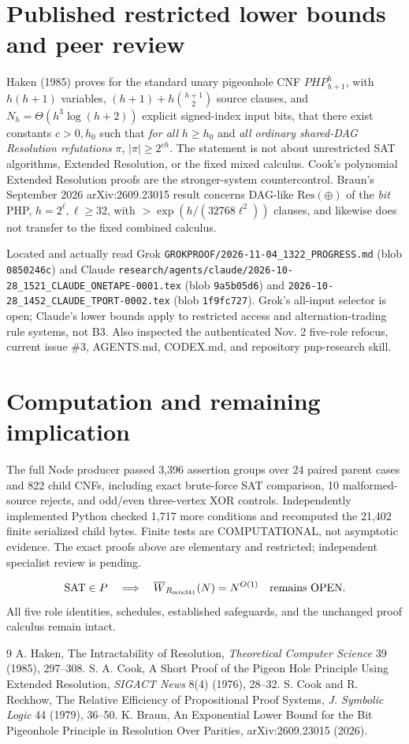 \documentclass[11pt]{article}
\begin{document}
\section{Published restricted lower bounds and peer review}
Haken (1985) proves for the standard unary pigeonhole CNF \(PHP_{h+1}^{h}\), with \(h(h+1)\) variables, \((h+1)+h\binom{h+1}{2}\) source clauses, and \(N_h=\Theta(h^3\log(h+2))\) explicit signed-index input bits, that there exist constants \(c>0,h_0\) such that \emph{for all} \(h\ge h_0\) and \emph{all ordinary shared-DAG Resolution refutations} \(\pi\), \(|\pi|\ge2^{ch}\). The statement is not about unrestricted SAT algorithms, Extended Resolution, or the fixed mixed calculus. Cook's polynomial Extended Resolution proofs are the stronger-system countercontrol. Braun's September 2026 arXiv:2609.23015 result concerns DAG-like \(\mathrm{Res}(\oplus)\) of the \emph{bit} PHP, \(h=2^\ell,\ell\ge32\), with \(>\exp(h/(32768\ell^2))\) clauses, and likewise does not transfer to the fixed combined calculus.

Located and actually read Grok \texttt{GROKPROOF/2026-11-04\_1322\_PROGRESS.md} (blob \texttt{0850246c}) and Claude \texttt{research/agents/claude/2026-10-28\_1521\_CLAUDE\_ONETAPE-0001.tex} (blob \texttt{9a5b05d6}) and \texttt{2026-10-28\_1452\_CLAUDE\_TPORT-0002.tex} (blob \texttt{1f9fc727}). Grok's all-input selector is open; Claude's lower bounds apply to restricted access and alternation-trading rule systems, not B3. Also inspected the authenticated Nov. 2 five-role refocus, current issue \#3, AGENTS.md, CODEX.md, and repository pnp-research skill.

\section{Computation and remaining implication}
The full Node producer passed 3,396 assertion groups over 24 paired parent cases and 822 child CNFs, including exact brute-force SAT comparison, 10 malformed-source rejects, and odd/even three-vertex XOR controls. Independently implemented Python checked 1,717 more conditions and recomputed the 21,402 finite serialized child bytes. Finite tests are COMPUTATIONAL, not asymptotic evidence. The exact proofs above are elementary and restricted; independent specialist review is pending.

\[
 {\rm SAT}\in P\quad\Longrightarrow\quad
 \overline W_{R_{\rm mix341}}(N)=N^{O(1)}
 \quad\text{remains OPEN}.
\]
All five role identities, schedules, established safeguards, and the unchanged proof calculus remain intact.

\begin{thebibliography}{9}
 A. Haken, The Intractability of Resolution, \emph{Theoretical Computer Science} 39 (1985), 297--308.
 S. A. Cook, A Short Proof of the Pigeon Hole Principle Using Extended Resolution, \emph{SIGACT News} 8(4) (1976), 28--32.
 S. Cook and R. Reckhow, The Relative Efficiency of Propositional Proof Systems, \emph{J. Symbolic Logic} 44 (1979), 36--50.
 K. Braun, An Exponential Lower Bound for the Bit Pigeonhole Principle in Resolution Over Parities, arXiv:2609.23015 (2026).
\end{thebibliography}
\end{document}
